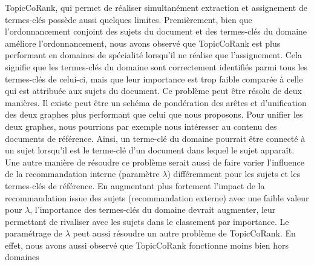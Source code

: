     TopicCoRank, qui permet de réaliser simultanément extraction et assignement
    de ter\-mes-clés possède aussi quelques limites. Premièrement, bien que
    l'ordonnancement conjoint des sujets du document et des termes-clés du
    domaine améliore l'ordonnancement, nous avons observé que TopicCoRank est
    plus performant en domaines de spécialité lorsqu'il ne réalise que
    l'assignement. Cela signifie que les termes-clés du domaine sont
    correctement identifiés parmi tous les termes-clés de celui-ci, mais que
    leur importance est trop faible comparée à celle qui est attribuée aux
    sujets du document. Ce problème peut être résolu de deux manières. Il existe
    peut être un schéma de pondération des arêtes et d'unification des deux
    graphes plus performant que celui que nous proposons. Pour unifier les deux
    graphes, nous pourrions par exemple nous intéresser au contenu des documents
    de référence. Ainsi, un terme-clé du domaine pourrait être connecté à un
    sujet lorsqu'il est le terme-clé d'un document dans lequel le sujet
    apparaît. Une autre manière de résoudre ce problème serait aussi de faire
    varier l'influence de la recommandation interne (paramètre $\lambda$)
    différemment pour les sujets et les termes-clés de référence. En augmentant
    plus fortement l'impact de la recommandation issue des sujets
    (recommandation externe) avec une faible valeur pour $\lambda$,
    l'importance des termes-clés du domaine devrait augmenter, leur permettant
    de rivaliser avec les sujets dans le classement par importance. Le paramétrage de
    $\lambda$ peut aussi résoudre un autre problème de TopicCoRank. En effet,
    nous avons aussi observé que TopicCoRank fonctionne moins bien hors domaines
